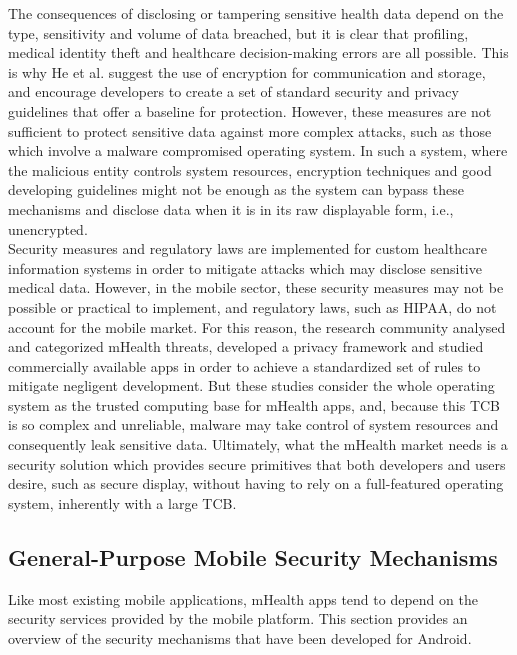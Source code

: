 The consequences of disclosing or tampering sensitive health data depend on the type, sensitivity and volume of data breached, but it is clear that profiling, medical identity theft and healthcare decision-making errors are all possible. This is why He et al. suggest the use of encryption for communication and storage, and encourage developers to create a set of standard security and privacy guidelines that offer a baseline for protection. However, these measures are not sufficient to protect sensitive data against more complex attacks, such as those which involve a malware compromised operating system. In such a system, where the malicious entity controls system resources, encryption techniques and good developing guidelines might not be enough as the system can bypass these mechanisms and disclose data when it is in its raw displayable form, i.e., unencrypted.\\

Security measures and regulatory laws are implemented for custom healthcare information systems in order to mitigate attacks which may disclose sensitive medical data. However, in the mobile sector, these security measures may not be possible or practical to implement, and regulatory laws, such as \ac{HIPAA}, do not account for the mobile market. For this reason, the research community analysed and categorized mHealth threats, developed a privacy framework and studied commercially available apps in order to achieve a standardized set of rules to mitigate negligent development. But these studies consider the whole operating system as the trusted computing base for mHealth apps, and, because this \ac{TCB} is so complex and unreliable, malware may take control of system resources and consequently leak sensitive data. Ultimately, what the mHealth market needs is a security solution which provides secure primitives that both developers and users desire, such as secure display, without having to rely on a full-featured operating system, inherently with a large \ac{TCB}.

\subsection{General-Purpose Mobile Security Mechanisms}

Like most existing mobile applications, mHealth apps tend to depend on the security services provided by the mobile platform. This section provides an overview of the security mechanisms that have been developed for Android.

